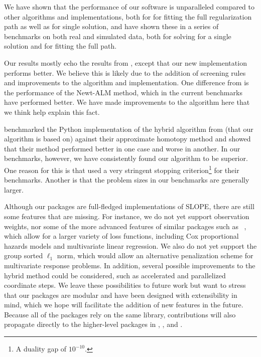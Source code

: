 \documentclass[article]{jss}
\begin{document}
We have shown that the performance of our software is unparalleled
compared to other algorithms and implementations, both for for fitting
the full regularization path as well as for single solution, and
have shown these in a series of benchmarks on both real and simulated
data, both for solving for a single solution and for fitting the full path.

Our results mostly echo the results from \citet{larsson2023}, except that
our new implementation performs better. We believe this is likely due to the
addition of screening rules and improvements to the algorithm and implementation.
One difference from \citet{larsson2023} is the performance of the Newt-ALM
method, which in the current benchmarks have performed better. We have
made improvements to the algorithm here that we think help explain this fact.

\citet{dupuis2024} benchmarked the Python implementation of the hybrid
algorithm from \citet{larsson2023} (that our algorithm is based on) against
their approximate homotopy method and showed that their method performed better
in one case and worse in another. In our benchmarks, however, we have
consistently found our algorithm to be superior. One reason for this is that
\citet{dupuis2024} used a very stringent stopping criterion\footnote{A duality
  gap of \(10^{-10}\).} for their benchmarks. Another is that the problem sizes in
our benchmarks are generally larger.

Although our packages are full-fledged implementations of SLOPE, there are
still some features that are missing. For instance, we do not yet support
observation weights, nor some of the more advanced features of similar packages
such as ~\citep{friedman2010}, which allow for a larger variety of
loss functions, including Cox proportional hazards models and multivariate
linear regression. We also do not yet support the group sorted \(\ell_1\) norm,
which would allow an alternative penalization scheme for multivariate response
problems. In addition, several possible improvements to the hybrid method
could be considered, such as accelerated and parallelized coordinate
steps. We leave these possibilities to future work but want to stress that
our packages are modular and have been designed with extensibility in mind,
which we hope will facilitate the addition of new features in the future.
Because all of the packages rely on the same  library, contributions
will also propagate directly to the higher-level packages in ,
, and .
\end{document}

